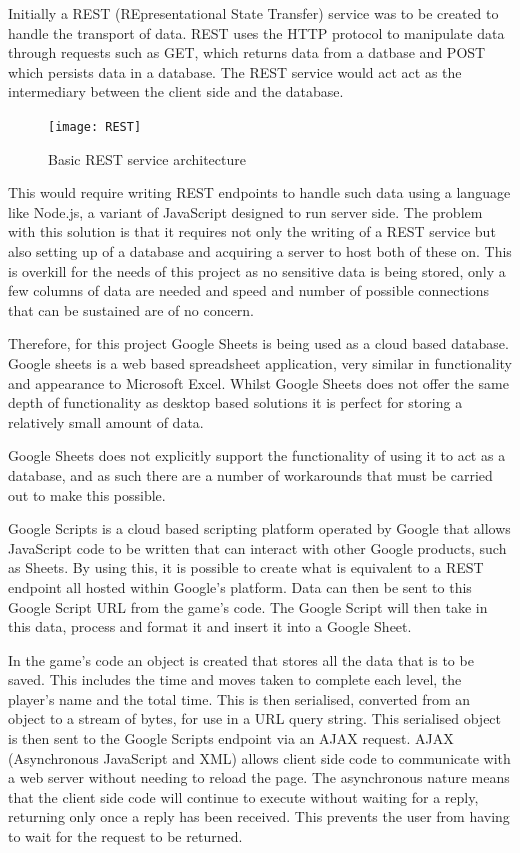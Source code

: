 \documentclass[12pt,a4paper]{report}
\begin{document}
Initially a REST (REpresentational State Transfer) service was to be created to handle the transport of data. REST uses the HTTP protocol to manipulate data through requests such as GET, which returns data from a datbase and POST which persists data in a database. The REST service would act act as the intermediary between the client side and the database.

\begin{figure}[h]
  \centering
  \begin{minipage}[b]{1\textwidth}
    \texttt{[image: REST]}
    \caption{Basic REST service architecture}
  \end{minipage}
\end{figure}
\FloatBarrier

This would require writing REST endpoints to handle such data using a language like Node.js, a variant of JavaScript designed to run server side. The problem with this solution is that it requires not only the writing of a REST service but also setting up of a database and acquiring a server to host both of these on. This is overkill for the needs of this project as no sensitive data is being stored, only a few columns of data are needed and speed and number of possible connections that can be sustained are of no concern.
 
Therefore, for this project Google Sheets is being used as a cloud based database. Google sheets is a web based spreadsheet application, very similar in functionality and appearance to Microsoft Excel. Whilst Google Sheets does not offer the same depth of functionality as desktop based solutions it is perfect for storing a relatively small amount of data.

Google Sheets does not explicitly support the functionality of using it to act as a database, and as such there are a number of workarounds that must be carried out to make this possible.

Google Scripts is a cloud based scripting platform operated by Google that allows JavaScript code to be written that can interact with other Google products, such as Sheets. By using this, it is possible to create what is equivalent to a REST endpoint all hosted within Google's platform. 
Data can then be sent to this Google Script URL from the game's code. The Google Script will then take in this data, process and format it and insert it into a Google Sheet.

In the game's code an object is created that stores all the data that is to be saved. This includes the time and moves taken to complete each level, the player's name and the total time. This is then serialised, converted from an object to a stream of bytes, for use in a URL query string. This serialised object is then sent to the Google Scripts endpoint via an AJAX request. AJAX (Asynchronous JavaScript and XML) allows client side code to communicate with a web server without needing to reload the page. The asynchronous nature means that the client side code will continue to execute without waiting for a reply, returning only once a reply has been received. This prevents the user from having to wait for the request to be returned.
\end{document}
